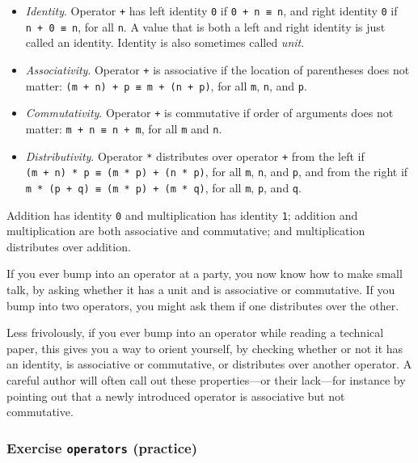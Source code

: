 \begin{itemize}
\item
  \emph{Identity}. Operator \texttt{+} has left identity \texttt{0} if
  \texttt{0\ +\ n\ ≡\ n}, and right identity \texttt{0} if
  \texttt{n\ +\ 0\ ≡\ n}, for all \texttt{n}. A value that is both a
  left and right identity is just called an identity. Identity is also
  sometimes called \emph{unit}.
\item
  \emph{Associativity}. Operator \texttt{+} is associative if the
  location of parentheses does not matter:
  \texttt{(m\ +\ n)\ +\ p\ ≡\ m\ +\ (n\ +\ p)}, for all \texttt{m},
  \texttt{n}, and \texttt{p}.
\item
  \emph{Commutativity}. Operator \texttt{+} is commutative if order of
  arguments does not matter: \texttt{m\ +\ n\ ≡\ n\ +\ m}, for all
  \texttt{m} and \texttt{n}.
\item
  \emph{Distributivity}. Operator \texttt{*} distributes over operator
  \texttt{+} from the left if
  \texttt{(m\ +\ n)\ *\ p\ ≡\ (m\ *\ p)\ +\ (n\ *\ p)}, for all
  \texttt{m}, \texttt{n}, and \texttt{p}, and from the right if
  \texttt{m\ *\ (p\ +\ q)\ ≡\ (m\ *\ p)\ +\ (m\ *\ q)}, for all
  \texttt{m}, \texttt{p}, and \texttt{q}.
\end{itemize}

Addition has identity \texttt{0} and multiplication has identity
\texttt{1}; addition and multiplication are both associative and
commutative; and multiplication distributes over addition.

If you ever bump into an operator at a party, you now know how to make
small talk, by asking whether it has a unit and is associative or
commutative. If you bump into two operators, you might ask them if one
distributes over the other.

Less frivolously, if you ever bump into an operator while reading a
technical paper, this gives you a way to orient yourself, by checking
whether or not it has an identity, is associative or commutative, or
distributes over another operator. A careful author will often call out
these properties---or their lack---for instance by pointing out that a
newly introduced operator is associative but not commutative.

\hypertarget{Induction-operators}{%
\subsubsection{\texorpdfstring{Exercise \texttt{operators}
(practice)}{Exercise operators (practice)}}\label{Induction-operators}}

